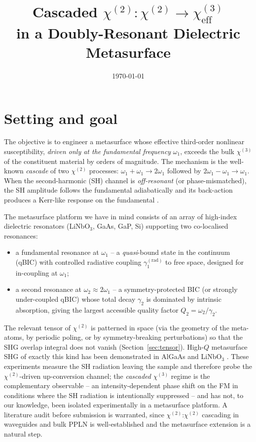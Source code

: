 \documentclass[11pt,a4paper]{article}
\newcommand{\chitwo}{\chi^{(2)}}
\newcommand{\chithree}{\chi^{(3)}}
\begin{document}
\title{Cascaded $\chi^{(2)}{:}\chi^{(2)} \to \chi^{(3)}_\text{eff}$ \\
       in a Doubly-Resonant Dielectric Metasurface}
\author{}
\date{\today}
\maketitle

\section{Setting and goal}

The objective is to engineer a metasurface whose effective third-order
nonlinear susceptibility, \emph{driven only at the fundamental frequency}
$\omega_1$, exceeds the bulk $\chithree$ of the constituent material by
orders of magnitude.  The mechanism is the well-known \emph{cascade} of
two $\chitwo$ processes:
$\omega_1+\omega_1\to 2\omega_1$ followed by $2\omega_1-\omega_1\to\omega_1$.
When the second-harmonic (SH) channel is \emph{off-resonant} (or
phase-mismatched), the SH amplitude follows the fundamental adiabatically
and its back-action produces a Kerr-like response on the fundamental
\cite{Ostrovskii1967,DeSalvo1992,Stegeman1996}.

The metasurface platform we have in mind consists of an array of
high-index dielectric resonators (LiNbO$_3$, GaAs, GaP, Si) supporting two
co-localised resonances:
\begin{itemize}
  \item a fundamental resonance at $\omega_1$ -- a \emph{quasi}-bound
        state in the continuum (qBIC) with controlled radiative coupling
        $\gamma_1^{(\text{rad})}$ to free space, designed for
        in-coupling at $\omega_1$;
  \item a second resonance at $\omega_2 \approx 2\omega_1$ -- a
        symmetry-protected BIC (or strongly under-coupled qBIC) whose
        total decay $\gamma_2$ is dominated by intrinsic absorption,
        giving the largest accessible quality factor
        $Q_2 = \omega_2/\gamma_2$.
\end{itemize}

The relevant tensor of $\chitwo$ is patterned in space (via the geometry
of the meta-atoms, by periodic poling, or by symmetry-breaking
perturbations) so that the SHG overlap integral does not vanish
(Section~\ref{sec:tensor}).  High-$Q$ metasurface SHG of exactly this
kind has been demonstrated in AlGaAs and LiNbO$_3$
\cite{Carletti2018,Koshelev2020,Anthur2020}.  These experiments measure
the SH radiation leaving the sample and therefore probe the
$\chitwo$-driven up-conversion channel; the \emph{cascaded}
$\chithree$ regime is the complementary observable -- an
intensity-dependent phase shift on the FM in conditions where the SH
radiation is intentionally suppressed -- and has not, to our
knowledge, been isolated experimentally in a metasurface platform.
A literature audit before submission is warranted, since
$\chitwo$:$\chitwo$ cascading in waveguides and bulk PPLN
\cite{DeSalvo1992,Stegeman1996,Bache2007} is well-established and the
metasurface extension is a natural step.
\end{document}
